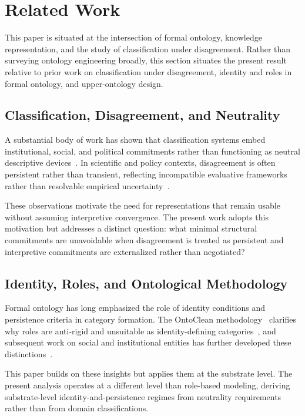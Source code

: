 \section{Related Work}
\label{sec:related}

This paper is situated at the intersection of formal ontology, knowledge
representation, and the study of classification under disagreement.
Rather than surveying ontology engineering broadly, this section situates the
present result relative to prior work on
classification under disagreement, identity and roles in formal ontology,
and upper-ontology design.

\subsection{Classification, Disagreement, and Neutrality}

A substantial body of work has shown that classification systems embed
institutional, social, and political commitments rather than functioning
as neutral descriptive devices~\citep{bowker1999sorting,haslanger2012resisting}.
In scientific and policy contexts, disagreement is often persistent rather
than transient, reflecting incompatible evaluative frameworks rather than
resolvable empirical uncertainty~\citep{longino1990science}.

These observations motivate the need for representations that remain usable
without assuming interpretive convergence.
The present work adopts this motivation but addresses a distinct question:
what minimal structural commitments are unavoidable when disagreement is treated as
persistent and interpretive commitments are externalized rather than negotiated?

\subsection{Identity, Roles, and Ontological Methodology}

Formal ontology has long emphasized the role of identity conditions and
persistence criteria in category formation.
The OntoClean methodology~\citep{guarino2002evaluating} clarifies why roles are
anti-rigid and unsuitable as identity-defining categories~\citep{guarino1998roles},
and subsequent work on social and institutional entities has further
developed these distinctions~\citep{masolo2003wonderweb}.

This paper builds on these insights but applies them at the substrate level.
The present analysis operates at a different level than role-based modeling,
deriving substrate-level identity-and-persistence regimes
from neutrality requirements rather than from domain classifications.

